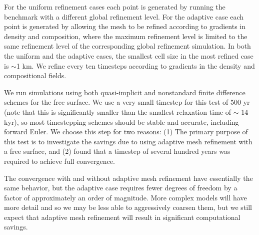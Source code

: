 \documentclass[preprint,12pt,authoryear]{elsarticle}
\begin{document}
For the uniform refinement cases each point is generated by running the benchmark with a different global refinement level.
For the adaptive case each point is generated by allowing the mesh to be refined according to gradients in density and composition,
where the maximum refinement level is limited to the same refinement level of the corresponding global refinement simulation.
In both the uniform and the adaptive cases, the smallest cell size in the most refined case is $\sim$1 km.
We refine every ten timesteps according to gradients in the density and compositional fields.

We run simulations using both quasi-implicit and nonstandard finite difference schemes for the free surface.
We use a very small timestep for this test of 500 yr (note that this is significantly smaller than the smallest
relaxation time of $\sim$ 14 kyr), so most timestepping schemes should be stable and accurate, including forward Euler.
We choose this step for two reasons: (1) The primary purpose of this test is to investigate the savings
due to using adaptive mesh refinement with a free surface, and (2) \citet{crameri2012comparison}
found that a timestep of several hundred years was required to achieve full convergence.

The convergence with and without adaptive mesh refinement have essentially the same behavior, but the adaptive case requires 
fewer degrees of freedom by a factor of approximately an order of magnitude. More complex models will have
more detail and so we may be less able to aggressively coarsen them, but we still expect that adaptive mesh refinement 
will result in significant computational savings.
\end{document}
